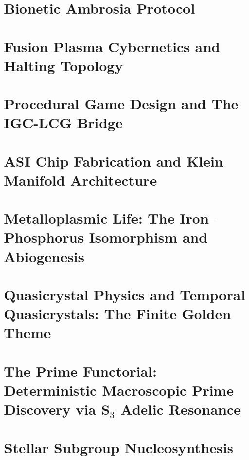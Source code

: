 \documentclass[12pt,oneside]{book}
\theoremstyle{principia}
\theoremstyle{definition}
\theoremstyle{remark}
\begin{document}
\chapter[Ambrosia Protocol]{Bionetic Ambrosia Protocol}


\chapter[Fusion Cybernetics]{Fusion Plasma Cybernetics and Halting Topology}


\chapter[Procedural Games]{Procedural Game Design and The IGC-LCG Bridge}\label{ch:games}


\chapter[ASI Chip]{ASI Chip Fabrication and Klein Manifold Architecture}\label{ch:asi}


\chapter[Metalloplasmic Life]{Metalloplasmic Life: The Iron--Phosphorus Isomorphism and Abiogenesis}\label{ch:metallo}


\chapter[Quasicrystal Physics]{Quasicrystal Physics and Temporal Quasicrystals: The Finite Golden Theme}\label{ch:qc-tqc}


\chapter[The Prime Functorial]{The Prime Functorial: Deterministic Macroscopic Prime Discovery via S$_3$ Adelic Resonance}\label{ch:functorial}


\chapter[Stellar Nucleosynthesis]{Stellar Subgroup Nucleosynthesis}

\end{document}
